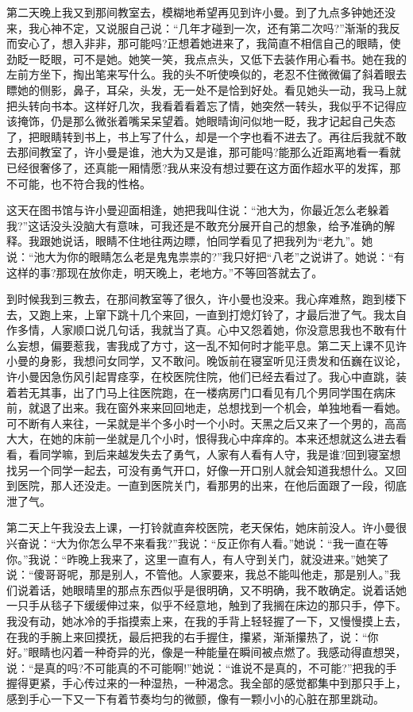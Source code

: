 \documentclass[12pt,oneside]{book}
\begin{document}
第二天晚上我又到那间教室去，模糊地希望再见到许小曼。到了九点多钟她还没来，我心神不定，又说服自己说：``几年才碰到一次，还有第二次吗?''渐渐的我反而安心了，想入非非，那可能吗?正想着她进来了，我简直不相信自己的眼睛，使劲眨一眨眼，可不是她。她笑一笑，我点点头，又低下去装作用心看书。她在我的左前方坐下，掏出笔来写什么。我的头不听使唤似的，老忍不住微微偏了斜着眼去瞟她的侧影，鼻子，耳朵，头发，无一处不是恰到好处。看见她头一动，我马上就把头转向书本。这样好几次，我看着看着忘了情，她突然一转头，我似乎不记得应该掩饰，仍是那么微张着嘴呆呆望着。她眼晴询问似地一眨，我才记起自己失态了，把眼睛转到书上，书上写了什么，却是一个字也看不进去了。再往后我就不敢去那间教室了，许小曼是谁，池大为又是谁，那可能吗?能那么近距离地看一看就已经很奢侈了，还真能一厢情愿?我从来没有想过要在这方面作超水平的发挥，那不可能，也不符合我的性格。

这天在图书馆与许小曼迎面相逢，她把我叫住说：``池大为，你最近怎么老躲着我?''这话没头没脑大有意味，可我还是不敢充分展开自己的想象，给予准确的解释。我跟她说话，眼睛不住地往两边瞟，怕同学看见了把我列为``老九''。她说：``池大为你的眼睛怎么老是鬼鬼祟祟的?''我只好把``八老''之说讲了。她说：``有这样的事?那现在放你走，明天晚上，老地方。''不等回答就去了。

到时候我到三教去，在那间教室等了很久，许小曼也没来。我心痒难熬，跑到楼下去，又跑上来，上窜下跳十几个来回，一直到打熄灯铃了，才最后泄了气。我太自作多情，人家顺口说几句话，我就当了真。心中又怨着她，你没意思我也不敢有什么妄想，偏要惹我，害我成了方寸，这一乱不知何时才能平息。第二天上课不见许小曼的身影，我想问女同学，又不敢问。晚饭前在寝室听见汪贵发和伍巍在议论，许小曼因急伤风引起胃痉孪，在校医院住院，他们已经去看过了。我心中直跳，装着若无其事，出了门马上往医院跑，在一楼病房门口看见有几个男同学围在病床前，就退了出来。我在窗外来来回回地走，总想找到一个机会，单独地看一看她。可不断有人来往，一呆就是半个多小时一个小时。天黑之后又来了一个男的，高高大大，在她的床前一坐就是几个小时，恨得我心中痒痒的。本来还想就这么进去看看，看同学嘛，到后来越发失去了勇气，人家有人看有人守，我是谁?回到寝室想找另一个同学一起去，可没有勇气开口，好像一开口别人就会知道我想什么。又回到医院，那人还没走。一直到医院关门，看那男的出来，在他后面跟了一段，彻底泄了气。

第二天上午我没去上课，一打铃就直奔校医院，老天保佑，她床前没人。许小曼很兴奋说：``大为你怎么早不来看我?''我说：``反正你有人看。''她说：``我一直在等你。''我说：``昨晚上我来了，这里一直有人，有人守到关门，就没进来。''她笑了说：``傻哥哥呢，那是别人，不管他。人家要来，我总不能叫他走，那是别人。''我们说着话，她眼晴里的那点东西似乎是很明确，又不明确，我不敢确定。说着话她一只手从毯子下缓缓伸过来，似乎不经意地，触到了我搁在床边的那只手，停下。我没有动，她冰冷的手指摸索上来，在我的手背上轻轻握了一下，又慢慢摸上去，在我的手腕上来回摸抚，最后把我的右手握住，攥紧，渐渐攥热了，说：``你好。''眼睛也闪着一种奇异的光，像是一种能量在瞬间被点燃了。我感动得直想哭，说：``是真的吗?不可能真的不可能啊!''她说：``谁说不是真的，不可能?''把我的手握得更紧，手心传过来的一种湿热，一种渴念。我全部的感觉都集中到那只手上，感到手心一下又一下有着节奏均匀的微颤，像有一颗小小的心脏在那里跳动。
\end{document}
